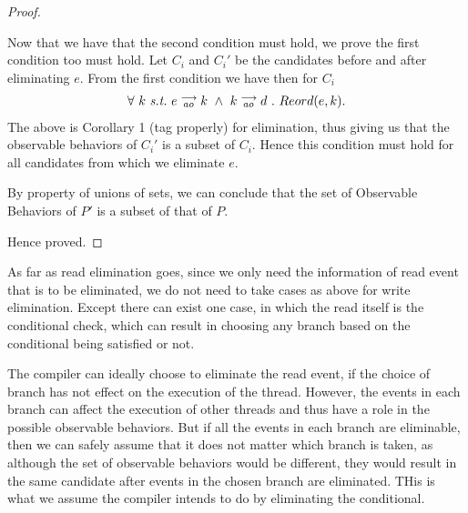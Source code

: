 \begin{proof}
\begin{itemize}

                
        \end{itemize}

        Now that we have that the second condition must hold, we prove the first condition too must hold. Let $C_i$ and $C_i'$ be the candidates before and after eliminating $e$. From the first condition we have then for $C_i$
        \begin{align*}
            \forall \ k \ \textit{s.t.} \ 
            \reln{e}{ao}{k} \ \wedge \ \reln{k}{ao}{d} \ . \ 
            Reord(e,k).
        \end{align*}
        The above is Corollary 1 (tag properly) for elimination, thus giving us that the observable behaviors of $C_i'$ is a subset of $C_i$. Hence this condition must hold for all candidates from which we eliminate $e$. 

        By property of unions of sets, we can conclude that the set of Observable Behaviors of $P'$ is a subset of that of $P$.

        Hence proved.

    \end{proof}

    As far as read elimination goes, since we only need the information of read event that is to be eliminated, we do not need to take cases as above for write elimination. Except there can exist one case, in which the read itself is the conditional check, which can result in choosing any branch based on the conditional being satisfied or not. 
    
    The compiler can ideally choose to eliminate the read event, if the choice of branch has not effect on the execution of the thread. However, the events in each branch can affect the execution of other threads and thus have a role in the possible observable behaviors. But if all the events in each branch are eliminable, then we can safely assume that it does not matter which branch is taken, as although the set of observable behaviors would be different, they would result in the same candidate after events in the chosen branch are eliminated. THis is what we assume the compiler intends to do by eliminating the conditional. 

